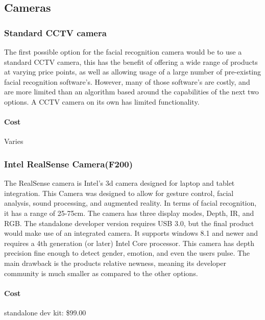 \documentclass[10pt, onecolumn, twoside, peerreview]{IEEEtran}
\begin{document}
\subsection{Cameras}
\subsubsection{Standard CCTV camera}
The first possible option for the facial recognition camera would be to use a standard CCTV camera, this has the
benefit of offering a wide range of products at varying price points, as well as allowing usage of a large number of
pre-existing facial recognition software’s. However, many of those software’s are costly, and are more limited than an
algorithm based around the capabilities of the next two options. A CCTV camera on its own has limited functionality.
\paragraph{Cost} Varies\\

\subsubsection{Intel RealSense Camera(F200)}
The RealSense camera is Intel’s 3d camera designed for laptop and tablet integration. This Camera was designed to allow
for gesture control, facial analysis, sound processing, and augmented reality. In terms of facial recognition, it has a
range of 25-75cm. The camera has three display modes, Depth, IR, and RGB. The standalone developer version requires USB
3.0, but the final product would make use of an integrated camera. It supports windows 8.1 and newer and requires a 4th
generation (or later) Intel Core processor. This camera has depth precision fine enough to detect gender, emotion, and
even the users pulse. The main drawback is the products relative newness, meaning its developer community is much
smaller as compared to the other options.
\paragraph{Cost} standalone dev kit: \$99.00\\
\end{document}
